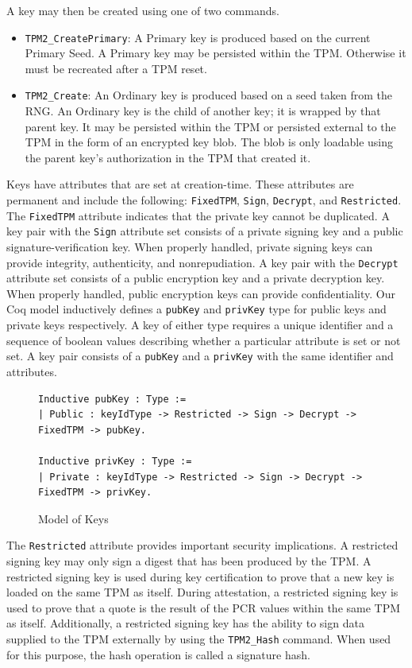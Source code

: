 \documentclass[runningheads]{llncs}
\begin{document}
A key may then be created using one of two commands.
\begin{itemize}
  \item \verb|TPM2_CreatePrimary|: A Primary key is produced based on the current Primary Seed. A Primary key may be persisted within the TPM. Otherwise it must be recreated after a TPM reset.
  \item \verb|TPM2_Create|: An Ordinary key is produced based on a seed taken from the RNG. An Ordinary key is the child of another key; it is wrapped by that parent key. It may be persisted within the TPM or persisted external to the TPM in the form of an encrypted key blob. The blob is only loadable using the parent key's authorization in the TPM that created it.
\end{itemize}
Keys have attributes that are set at creation-time. These attributes are permanent and include the following: \verb|FixedTPM|, \verb|Sign|, \verb|Decrypt|, and \verb|Restricted|. The \verb|FixedTPM| attribute indicates that the private key cannot be duplicated. A key pair with the \verb|Sign| attribute set consists of a private signing key and a public signature-verification key. When properly handled, private signing keys can provide integrity, authenticity, and nonrepudiation. A key pair with the \verb|Decrypt| attribute set consists of a public encryption key and a private decryption key. When properly handled, public encryption keys can provide confidentiality.
Our Coq model inductively defines a \verb|pubKey| and \verb|privKey| type for public keys and private keys respectively. A key of either type requires a unique identifier and a sequence of boolean values describing whether a particular attribute is set or not set. A key pair consists of a \verb|pubKey| and a \verb|privKey| with the same identifier and attributes.
\begin{figure}[h]
\begin{lstlisting}[language=Coq]
Inductive pubKey : Type :=
| Public : keyIdType -> Restricted -> Sign -> Decrypt -> FixedTPM -> pubKey.

Inductive privKey : Type :=
| Private : keyIdType -> Restricted -> Sign -> Decrypt -> FixedTPM -> privKey.
\end{lstlisting}

\caption{Model of Keys}
\end{figure}

The \verb|Restricted| attribute provides important security
implications. A restricted signing key may only sign a digest that has
been produced by the TPM. A restricted signing key is used during key
certification to prove that a new key is loaded on the same TPM as
itself. During attestation, a restricted signing key is used to prove
that a quote is the result of the PCR values within the same TPM as
itself. Additionally, a restricted signing key has the ability to sign
data supplied to the TPM externally by using the \verb|TPM2_Hash|
command. When used for this purpose, the hash operation is called a
signature hash.
\end{document}
